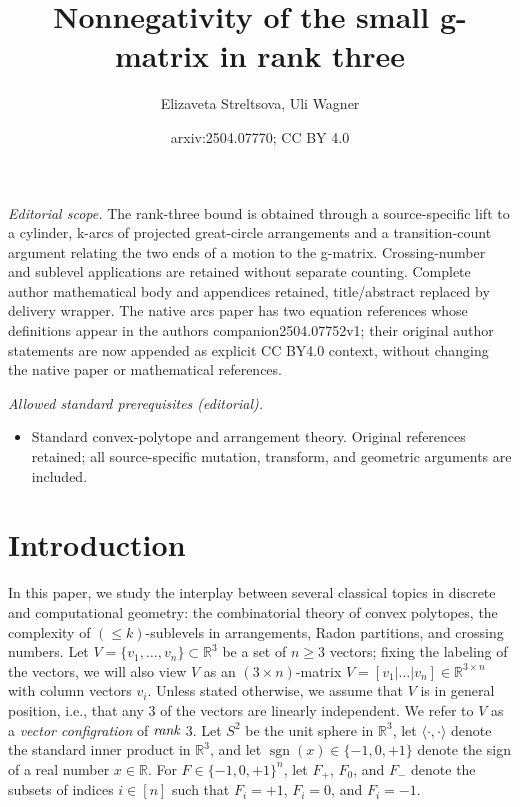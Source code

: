 \documentclass[11pt]{article}
\title{Nonnegativity of the small g-matrix in rank three}
\author{Elizaveta Streltsova, Uli Wagner}
\date{arxiv:2504.07770; CC BY 4.0}
\DeclareMathOperator{\sgn}{sgn}
\renewcommand{\leq}{\leqslant}
\renewcommand{\geq}{\geqslant}
\newcommand{\R}{\mathbb{R}}
\begin{document}
\maketitle
\noindent\textit{Editorial scope.} The rank-three bound is obtained through a source-specific lift to a cylinder, k-arcs of projected great-circle arrangements and a transition-count argument relating the two ends of a motion to the g-matrix. Crossing-number and sublevel applications are retained without separate counting. Complete author mathematical body and appendices retained, title/abstract replaced by delivery wrapper. The native arcs paper has two equation references whose definitions appear in the authors companion2504.07752v1; their original author statements are now appended as explicit CC BY4.0 context, without changing the native paper or mathematical references.\par\medskip
\noindent\textit{Allowed standard prerequisites (editorial).}\begin{itemize}
\item Standard convex-polytope and arrangement theory. Original references retained; all source-specific mutation, transform, and geometric arguments are included.
\end{itemize}\medskip
\section{Introduction}
\label{s:intro}
In this paper, we study the interplay between several classical topics in discrete and computational geometry: the combinatorial theory of convex polytopes, the complexity of $(\leq k)$-sublevels in arrangements, Radon partitions, and crossing numbers.
%
Let $V = \{ v_1, \ldots, v_n \} \subset \R^3$ be a set of $n\geq 3$ vectors; fixing the labeling of the vectors, we will also view $V$ as an $(3 \times n)$-matrix $V=[v_1|\dots|v_n] \in \R^{3 \times n}$ with column vectors $v_i$. Unless stated otherwise, we assume that $V$ is in general position, i.e., that any $3$ of the vectors are linearly independent. We refer to $V$ as a \emph{vector configration} of $\emph{rank}$ $3$. 
%
Let $S^2$ be the unit sphere in $\R^3$, let $\langle\cdot ,\cdot \rangle$ denote the standard inner product in $\R^3$, and let $\sgn(x)\in \{-1,0,+1\}$ denote the sign of a real number $x\in \R$. 
For $F\in \{-1,0,+1\}^n$, let $F_+$, $F_0$, and $F_-$ denote the subsets of indices $i\in [n]$ such that $F_i=+1$, $F_i=0$, and $F_i=-1$.
%
%
\end{document}
